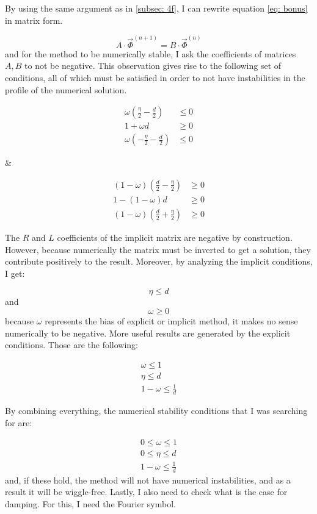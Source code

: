 By using the same argument as in \ref{subsec: 4f}, I can rewrite equation \ref{eq: bonus} in matrix form.

\[
	A \cdot \vec{\Phi}^{(n+1)} = B \cdot \vec{\Phi}^{(n)}
\]
and for the method to be numerically stable, I ask the coefficients of matrices \(A, B\) to not be negative. This observation gives rise to the following set of conditions, all of which must be satisfied in order to not have instabilities in the profile of the numerical solution.

\noindent
\begin{minipage}{0.45\textwidth} %
	\begin{align*}
		\omega \left( \frac{\eta}{2} - \frac{d}{2} \right) &\leq 0 \\
		1 + \omega d &\geq 0 \\
		\omega \left( -\frac{\eta}{2} - \frac{d}{2} \right) &\leq 0
	\end{align*}
\end{minipage}
\hfill \& \hfill
\begin{minipage}{0.45\textwidth} %
	\begin{align*}
		(1 - \omega) \left( \frac{d}{2} - \frac{\eta}{2} \right) &\geq 0 \\
		1 - (1-\omega)d &\geq 0 \\
		(1  - \omega) \left(\frac{d}{2} + \frac{\eta}{2} \right) &\geq 0
	\end{align*}
\end{minipage}

The \(R\) and \(L\) coefficients of the implicit matrix are negative by construction. However, because numerically the matrix must be inverted to get a solution, they contribute positively to the result. Moreover, by analyzing the implicit conditions, I get:

\[
	\eta \leq d
\]
and
\[
	\omega \geq 0
\]
because \( \omega \) represents the bias of explicit or implicit method, it makes no sense numerically to be negative. More useful results are generated by the explicit conditions. Those are the following:

\begin{gather*}
	\omega \leq 1 \\
	\eta \leq d \\
	1 -\omega \leq \frac{1}{d}
\end{gather*}

By combining everything, the numerical stability conditions that I was searching for are:

\begin{gather*}
	0 \leq \omega \leq 1 \\
	0 \leq \eta \leq d \\
	1 - \omega \leq \frac{1}{d}
\end{gather*}
and, if these hold, the method will not have numerical instabilities, and as a result it will be wiggle-free. Lastly, I also need to check what is the case for damping. For this, I need the Fourier symbol.


